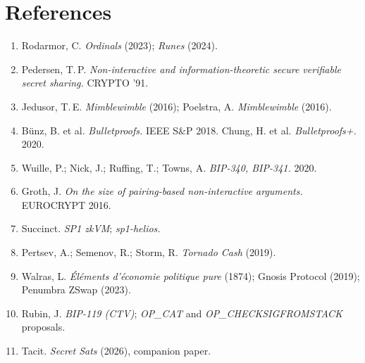 \documentclass[11pt,letterpaper]{article}
\begin{document}
\section*{References}
{\small
\begin{enumerate}[leftmargin=2em]
\item Rodarmor, C. \emph{Ordinals} (2023); \emph{Runes} (2024).
\item Pedersen, T.\,P. \emph{Non-interactive and information-theoretic secure verifiable secret sharing.} CRYPTO '91.
\item Jedusor, T.\,E. \emph{Mimblewimble} (2016); Poelstra, A. \emph{Mimblewimble} (2016).
\item B\"unz, B. et al. \emph{Bulletproofs.} IEEE S\&P 2018. Chung, H. et al. \emph{Bulletproofs+.} 2020.
\item Wuille, P.; Nick, J.; Ruffing, T.; Towns, A. \emph{BIP-340, BIP-341.} 2020.
\item Groth, J. \emph{On the size of pairing-based non-interactive arguments.} EUROCRYPT 2016.
\item Succinct. \emph{SP1 zkVM}; \emph{sp1-helios.}
\item Pertsev, A.; Semenov, R.; Storm, R. \emph{Tornado Cash} (2019).
\item Walras, L. \emph{\'El\'ements d'\'economie politique pure} (1874); Gnosis Protocol (2019); Penumbra ZSwap (2023).
\item Rubin, J. \emph{BIP-119 (CTV)}; \emph{OP\_CAT} and \emph{OP\_CHECKSIGFROMSTACK} proposals.
\item Tacit. \emph{Secret Sats} (2026), companion paper.
\end{enumerate}
}
\end{document}
